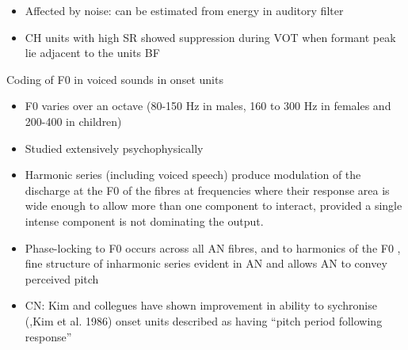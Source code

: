\documentclass[10pt,a4paper]{article}
\begin{document}
\begin{itemize}
  \begin{itemize}
  \item Affected by noise: can be estimated from energy in auditory filter
  \item CH units with high SR showed suppression during VOT when formant peak
    lie adjacent to the units BF
  \end{itemize}
\end{itemize}
Coding of F0 in voiced sounds in onset units \citep{PalmerWinter:1993}


\begin{itemize}
\item F0 varies over an octave (80-150 Hz in males, 160 to 300 Hz in females and
  200-400 in children)
\item Studied extensively psychophysically \citep{Evans:1978, Greenberg:1980}
\item Harmonic series (including voiced speech) produce modulation of the
  discharge at the F0 of the fibres at frequencies where their response area is
  wide enough to allow more than one component to interact, provided a single
  intense component is not dominating the output.
\item Phase-locking to F0 occurs across all AN fibres, and to harmonics of the
  F0 \citep{MillerSachs:1984,Palmer:1990}, fine structure of inharmonic series
  evident in AN and allows AN to convey perceived pitch \citep{Evans:1978,
    DelgutteKiang:1991}
\item CN: Kim and collegues have shown improvement in ability to sychronise
  \citep{KimLeonard:1988}(,Kim et al. 1986) onset units described as having
  {\textquotedblleft}pitch period following response{\textquotedblright}
\end{itemize}
\citep{RecioRhode:2000}
\end{document}
